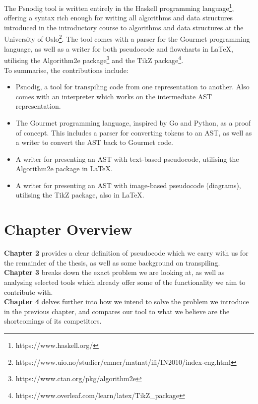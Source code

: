 The Psnodig tool is written entirely in the Haskell programming language\footnote{https://www.haskell.org/}, offering a syntax rich enough for writing all algorithms and data structures introduced in the introductory course to algorithms and data structures at the University of Oslo\footnote{https://www.uio.no/studier/emner/matnat/ifi/IN2010/index-eng.html}. The tool comes with a parser for the Gourmet programming language, as well as a writer for both pseudocode and flowcharts in \LaTeX, utilising the Algorithm2e package\footnote{https://www.ctan.org/pkg/algorithm2e} and the TikZ package\footnote{https://www.overleaf.com/learn/latex/TikZ\_package}. \hfill \\

To summarise, the contributions include:
\begin{itemize}
    \item Psnodig, a tool for transpiling code from one representation to another. Also comes with an interpreter which works on the intermediate AST representation.
    \item The Gourmet programming language, inspired by Go and Python, as a proof of concept. This includes a parser for converting tokens to an AST, as well as a writer to convert the AST back to Gourmet code.
    \item A writer for presenting an AST with text-based pseudocode, utilising the Algorithm2e package in \LaTeX.
    \item A writer for presenting an AST with image-based pseudocode (diagrams), utilising the TikZ package, also in \LaTeX.
\end{itemize}

\section{Chapter Overview}

\textbf{Chapter 2} provides a clear definition of pseudocode which we carry with us for the remainder of the thesis, as well as some background on transpiling. \hfill \\

\textbf{Chapter 3} breaks down the exact problem we are looking at, as well as analysing selected tools which already offer some of the functionality we aim to contribute with. \hfill \\

\textbf{Chapter 4} delves further into how we intend to solve the problem we introduce in the previous chapter, and compares our tool to what we believe are the shortcomings of its competitors. \hfill \\

